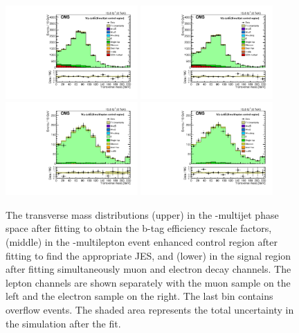 \begin{figure}[htb]
\caption[Three-step fitting procedure for \wbb measurement]{
 The transverse mass distributions (upper) in the \ttbar-multijet
  phase space after fitting to obtain the b-tag efficiency rescale factors,
  (middle) in the \ttbar-multilepton event enhanced control region
  after fitting to find the appropriate JES,
  and (lower) in the \wbb signal region
  after fitting simultaneously muon and electron decay channels.
 The lepton channels are shown separately with the muon
  sample on the left and the electron sample on the right.
 The last bin contains overflow events.
 The shaded area represents the total uncertainty in the simulation after the fit.
 }
\center
\includegraphics[width=0.45\textwidth]{pdfs/wbbxc/pape/poststep1_ttjjj_mt_mu} 
\includegraphics[width=0.45\textwidth]{pdfs/wbbxc/pape/poststep1_ttjjj_mt_ele}
\includegraphics[width=0.45\textwidth]{pdfs/wbbxc/pape/poststep2_ttme_mt_mu}  
\includegraphics[width=0.45\textwidth]{pdfs/wbbxc/pape/poststep2_ttme_mt_ele} 

\end{figure}

